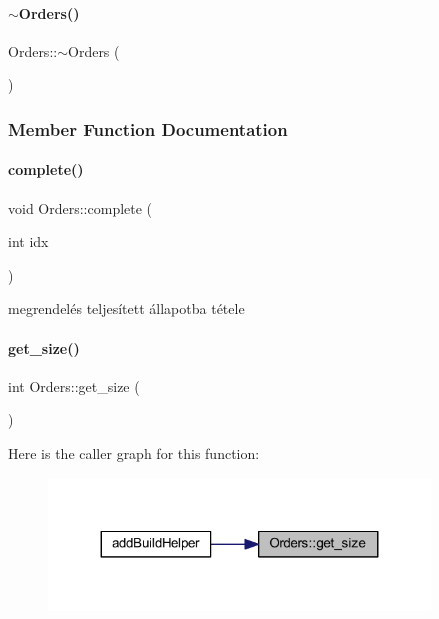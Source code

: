 \paragraph{\texorpdfstring{$\sim$Orders()}{~Orders()}}
{\footnotesize\ttfamily Orders\+::$\sim$\+Orders (\begin{DoxyParamCaption}{ }\end{DoxyParamCaption})\hspace{0.3cm}{\ttfamily [inline]}}



\subsubsection{Member Function Documentation}
\mbox{\label{class_orders_a6a47de51d6d88328ff6408482f614e8e}} 
\paragraph{\texorpdfstring{complete()}{complete()}}
{\footnotesize\ttfamily void Orders\+::complete (\begin{DoxyParamCaption}\item[{int}]{idx }\end{DoxyParamCaption})}



megrendelés teljesített állapotba tétele 

\mbox{\label{class_orders_a9b6a5342d1fe2954f061d91609d3fe89}} 
\paragraph{\texorpdfstring{get\_size()}{get\_size()}}
{\footnotesize\ttfamily int Orders\+::get\+\_\+size (\begin{DoxyParamCaption}{ }\end{DoxyParamCaption})\hspace{0.3cm}{\ttfamily [inline]}}

Here is the caller graph for this function\+:
\nopagebreak
\begin{figure}[H]
\begin{center}
\leavevmode
\includegraphics[width=287pt]{class_orders_a9b6a5342d1fe2954f061d91609d3fe89_icgraph}
\end{center}
\end{figure}
\mbox{\label{class_orders_af0edb320aab3dcae0ee615a5459b5595}} 
